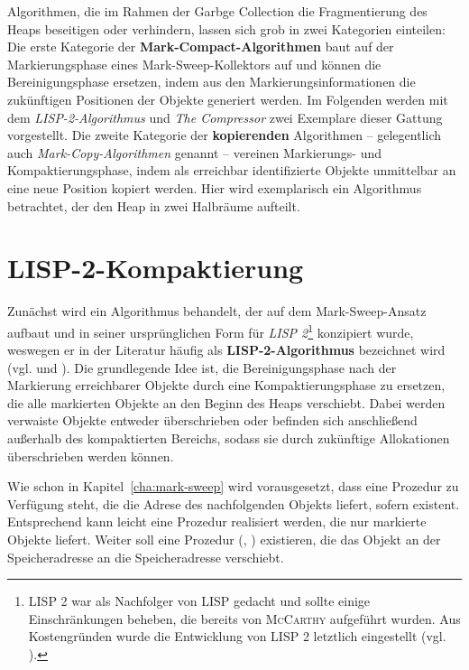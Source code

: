 Algorithmen, die im Rahmen der Garbge Collection die Fragmentierung des Heaps beseitigen oder verhindern, lassen sich grob in zwei Kategorien einteilen:
Die erste Kategorie der \textbf{Mark-Compact-Algorithmen} baut auf der Markierungsphase eines Mark-Sweep-Kollektors auf und können die Bereinigungsphase ersetzen, indem aus den Markierungsinformationen die zukünftigen Positionen der Objekte generiert werden.
Im Folgenden werden mit dem \textit{LISP-2-Algorithmus} und \textit{The Compressor} zwei Exemplare dieser Gattung vorgestellt.
Die zweite Kategorie der \textbf{kopierenden} Algorithmen -- gelegentlich auch \textit{Mark-Copy-Algorithmen} genannt -- vereinen Markierungs- und Kompaktierungsphase, indem als erreichbar identifizierte Objekte unmittelbar an eine neue Position kopiert werden.
Hier wird exemplarisch ein Algorithmus betrachtet, der den Heap in zwei Halbräume aufteilt.




\section{LISP-2-Kompaktierung}
\label{sec:lisp2-compact}
Zunächst wird ein Algorithmus behandelt, der auf dem Mark-Sweep-Ansatz aufbaut und in seiner ursprünglichen Form für \textit{LISP 2}\footnote{LISP 2 war als Nachfolger von LISP gedacht und sollte einige Einschränkungen beheben, die bereits von \textsc{McCarthy} aufgeführt wurden. Aus Kostengründen wurde die Entwicklung von LISP 2 letztlich eingestellt (vgl. \cite{lisp-history}).} konzipiert wurde, weswegen er in der Literatur häufig als \textbf{LISP-2-Algorithmus} bezeichnet wird (vgl. \cite[Kap. 3.2]{handbook} und \cite{lisp2gc}).
Die grundlegende Idee ist, die Bereinigungsphase nach der Markierung erreichbarer Objekte durch eine Kompaktierungsphase zu ersetzen, die alle markierten Objekte an den Beginn des Heaps verschiebt.
Dabei werden verwaiste Objekte entweder überschrieben oder befinden sich anschließend außerhalb des kompaktierten Bereichs, sodass sie durch zukünftige Allokationen überschrieben werden können.

Wie schon in Kapitel~\ref{cha:mark-sweep} wird vorausgesetzt, dass eine Prozedur zu Verfügung steht, die die Adrese des nachfolgenden Objekts liefert, sofern existent.
Entsprechend kann leicht eine Prozedur  realisiert werden, die nur markierte Objekte liefert.
Weiter soll eine Prozedur (, ) existieren, die das Objekt an der Speicheradresse  an die Speicheradresse  verschiebt.

